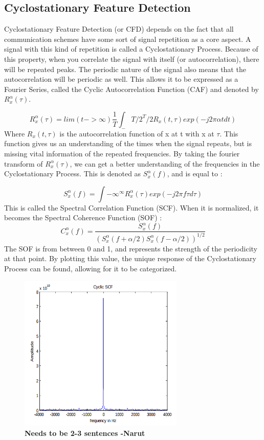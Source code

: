 \subsection{Cyclostationary Feature Detection} \label{Cyclostationary Feature Detection}
Cyclostationary Feature Detection (or CFD) depends on the fact that all communication schemes have some sort of signal repetition as a core aspect. A signal with this kind of repetition is called a Cyclostationary Process\cite{cyclostat_journal}. Because of this property, when you correlate the signal with itself (or autocorrelation), there will be repeated peaks. The periodic nature of the signal also means that the autocorrelation will be periodic as well. This allows it to be expressed as a Fourier Series, called the Cyclic Autocorrelation Function (CAF) and denoted by $R_x^\alpha(\tau)$\cite{cyclostat_text}.\par 
\[R_x^\alpha(\tau)=lim(t->\infty) \frac{1}{T} \int_-T/2^T/2 R_x(t,\tau)exp(-j2\pi\alpha t dt)\]
Where $R_x(t,\tau)$ is the autocorrelation function of x at t with x at $\tau$. This function gives us an understanding of the times when the signal repeats, but is missing vital information of the repeated frequencies. By taking the fourier transform of $R_x^\alpha(\tau)$, we can get a better understanding of the frequencies in the Cyclostationary Process. This is denoted as $S_x^\alpha(f)$, and is equal to \cite{cyclostat_text}:  \par
\[ S_x^\alpha(f)=\int{-\infty}^{\infty} R_x^\alpha(\tau)exp(-j2\pi f\tau d\tau) \]
This is called the Spectral Correlation Function (SCF). When it is normalized, it becomes the Spectral Coherence Function (SOF) \cite{cyclostat_text}:
\[C_x^\alpha(f) = \frac{ S_x^\alpha(f)}{ (S_x^\alpha(f+\alpha/2) S_x^\alpha(f-\alpha/2))^{1/2}} \]
The SOF is from between 0 and 1, and represents the strength of the periodicity at that point. By plotting this value, the unique response of the Cyclostationary Process can be found, allowing for it to be categorized.\par
\begin{figure}[ht]
\centering
\includegraphics[width=0.70\textwidth]{img/cyclic_scf.png}
\caption{\textbf{Needs to be 2-3 sentences -Narut}}
\label{fig:cyclic_scf}
\end{figure}
